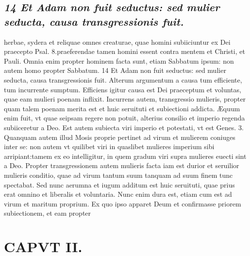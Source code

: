 \documentclass{article}
\begin{document}
\begin{pages}
\subsection*{\textit{14 Et Adam non fuit seductus: sed mulier seducta, causa transgressionis fuit.}}herbae, sydera et reliquae omnes creaturae, quae homini subiiciuntur ex Dei praecepto Psal. 8.praeferendae tamen homini essent contra mentem et Christi, et Pauli. Omnia enim propter hominem facta sunt, etiam Sabbatum ipsum: non autem homo propter Sabbatum. 14 Et Adam non fuit seductus: sed mulier seducta, causa transgressionis fuit. Alterum argumentum a causa tum efficiente, tum incurrente sumptum. Efficiens igitur causa est Dei praeceptum et voluntas, quae eam mulieri poenam inflixit. Incurrens autem, transgressio mulieris, propter quam talem poenam merita est et huic seruituti et subiectioni addicta. Æquum enim fuit, vt quae seipsam regere non potuit, alterius consilio et imperio regenda subiiceretur a Deo. Est autem subiecta viri imperio et potestati, vt est Genes. 3. Quanquam autem illud Mosis proprie pertinet ad virum et mulierem coniuges inter se: non autem vt quilibet viri in quaslibet mulieres imperium sibi arripiant:tamem ex eo intelligitur, in quem gradum viri supra mulieres euecti sint a Deo. Propter transgressionem autem mulieris facta iam est durior et seruilior mulieris conditio, quae ad virum tantum suum tanquam ad suum finem tunc spectabat. Sed nunc aerumna et iugum additum est huic seruituti, quae prius erat omnino et liberalis et voluntaria. Nunc enim dura est, etiam cum est ad virum et maritum proprium. Ex quo ipso apparet Deum et confirmasse priorem subiectionem, et eam propter  \pend
\section*{CAPVT  II. }
\marginpar{[ p.89 ]}\pstart {}
{}

\end{pages}
\end{document}
